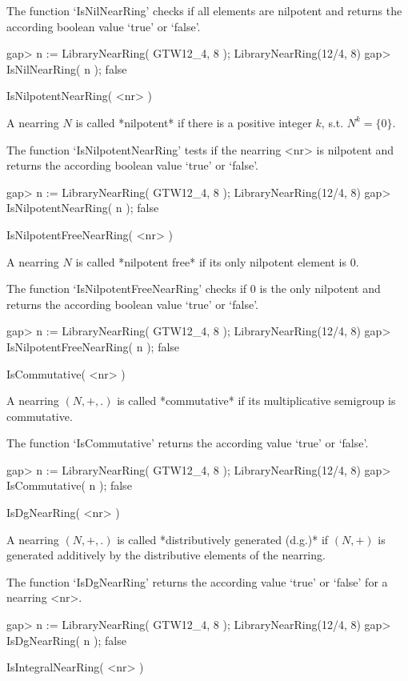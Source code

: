 The function `IsNilNearRing' checks if all elements are nilpotent and returns
the according boolean value `true' or `false'.

\beginexample
    gap> n := LibraryNearRing( GTW12_4, 8 );            
    LibraryNearRing(12/4, 8)
    gap> IsNilNearRing( n );
    false
\endexample

\>IsNilpotentNearRing( <nr> )

A nearring $N$ is called *nilpotent* if there is a positive integer
$k$, s.t. $N^k = \{0\}$.

The function `IsNilpotentNearRing' tests if
the nearring <nr> is nilpotent and returns the according boolean value 
`true' or `false'.

\beginexample
    gap> n := LibraryNearRing( GTW12_4, 8 );            
    LibraryNearRing(12/4, 8)
    gap> IsNilpotentNearRing( n );
    false
\endexample

\>IsNilpotentFreeNearRing( <nr> )

A nearring $N$ is called *nilpotent free* if its only nilpotent
element is $0$.

The function `IsNilpotentFreeNearRing' checks if 
$0$ is the only nilpotent and returns the according boolean value 
`true' or `false'.

\beginexample
    gap> n := LibraryNearRing( GTW12_4, 8 );            
    LibraryNearRing(12/4, 8)
    gap> IsNilpotentFreeNearRing( n );
    false
\endexample

\>IsCommutative( <nr> )

A nearring $(N,+,.)$ is called *commutative* if its multiplicative semigroup
is commutative.

The function `IsCommutative' returns the according value `true' or `false'.

\beginexample
    gap> n := LibraryNearRing( GTW12_4, 8 );            
    LibraryNearRing(12/4, 8)
    gap> IsCommutative( n );
    false
\endexample

\>IsDgNearRing( <nr> )

A nearring $(N,+,.)$ is called *distributively generated (d.g.)* if 
$(N,+)$ is generated additively by the distributive elements of the
nearring.

The function `IsDgNearRing' returns the according value `true' or `false'
for a nearring <nr>.

\beginexample
    gap> n := LibraryNearRing( GTW12_4, 8 );            
    LibraryNearRing(12/4, 8)
    gap> IsDgNearRing( n );
    false
\endexample

\>IsIntegralNearRing( <nr> )


